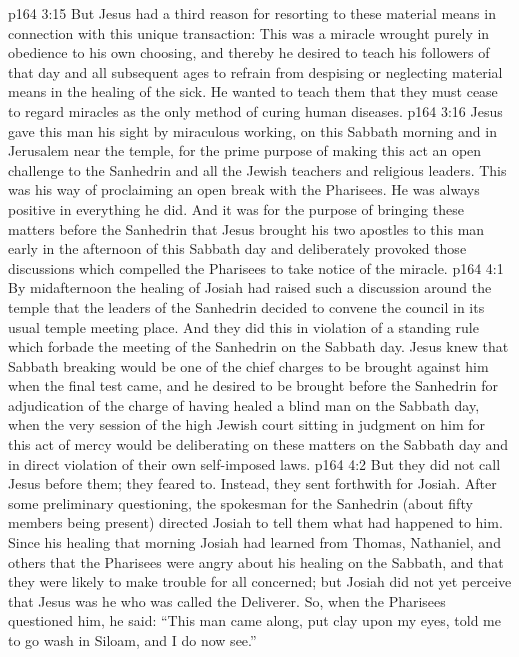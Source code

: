 \pc \vs p164 3:15 \bibnobreakspace But Jesus had a third reason for resorting to these material means in connection with this unique transaction: This was a miracle wrought purely in obedience to his own choosing, and thereby he desired to teach his followers of that day and all subsequent ages to refrain from despising or neglecting material means in the healing of the sick. He wanted to teach them that they must cease to regard miracles as the only method of curing human diseases.
\pc \vs p164 3:16 Jesus gave this man his sight by miraculous working, on this Sabbath morning and in Jerusalem near the temple, for the prime purpose of making this act an open challenge to the Sanhedrin and all the Jewish teachers and religious leaders. This was his way of proclaiming an open break with the Pharisees. He was always positive in everything he did. And it was for the purpose of bringing these matters before the Sanhedrin that Jesus brought his two apostles to this man early in the afternoon of this Sabbath day and deliberately provoked those discussions which compelled the Pharisees to take notice of the miracle.
\vs p164 4:1 By midafternoon the healing of Josiah had raised such a discussion around the temple that the leaders of the Sanhedrin decided to convene the council in its usual temple meeting place. And they did this in violation of a standing rule which forbade the meeting of the Sanhedrin on the Sabbath day. Jesus knew that Sabbath breaking would be one of the chief charges to be brought against him when the final test came, and he desired to be brought before the Sanhedrin for adjudication of the charge of having healed a blind man on the Sabbath day, when the very session of the high Jewish court sitting in judgment on him for this act of mercy would be deliberating on these matters on the Sabbath day and in direct violation of their own self\hyp{}imposed laws.
\vs p164 4:2 But they did not call Jesus before them; they feared to. Instead, they sent forthwith for Josiah. After some preliminary questioning, the spokesman for the Sanhedrin (about fifty members being present) directed Josiah to tell them what had happened to him. Since his healing that morning Josiah had learned from Thomas, Nathaniel, and others that the Pharisees were angry about his healing on the Sabbath, and that they were likely to make trouble for all concerned; but Josiah did not yet perceive that Jesus was he who was called the Deliverer. So, when the Pharisees questioned him, he said: “This man came along, put clay upon my eyes, told me to go wash in Siloam, and I do now see.”
